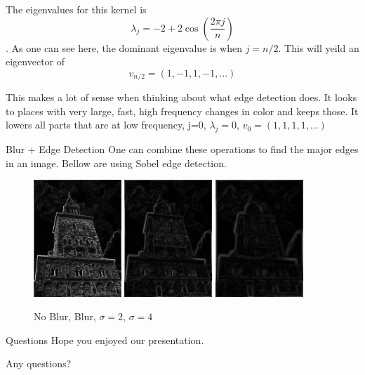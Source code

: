 \documentclass{beamer}
\begin{document}
\begin{frame}
The eigenvalues for this kernel is $$ \lambda_j = -2 + 2\cos(\dfrac{2\pi j}{n}) $$. As one can see here, the dominant eigenvalue is when $j=n/2$. This will yeild an eigenvector of 
$$v_{n/2} = (1,-1,1,-1, ...)$$

This makes a lot of sense when thinking about what edge detection does. It looks to places with very large, fast, high frequency changes in color and keeps those. It lowers all parts that are at low frequency, j=0, $\lambda_j = 0$, $v_0 = (1,1,1,1,...)$

\end{frame}

\begin{frame}{Blur + Edge Detection}
One can combine these operations to find the major edges in an image. Bellow are using Sobel edge detection.

\begin{figure}[ht]
\includegraphics[width=1.3in]{churchout.jpg}
\hspace{.1in} 
\includegraphics[width=1.3in]{churchoutbluredge.jpg}
\hspace{.1in}
\includegraphics[width=1.3in]{churchoutblur2edge.jpg}
\hspace{.1in}
\caption{No Blur, Blur, $\sigma = 2$, $\sigma = 4$}
\end{figure}
\end{frame}

\begin{frame}{Questions}
Hope you enjoyed our presentation. 

Any questions?
\end{frame}
\end{document}
